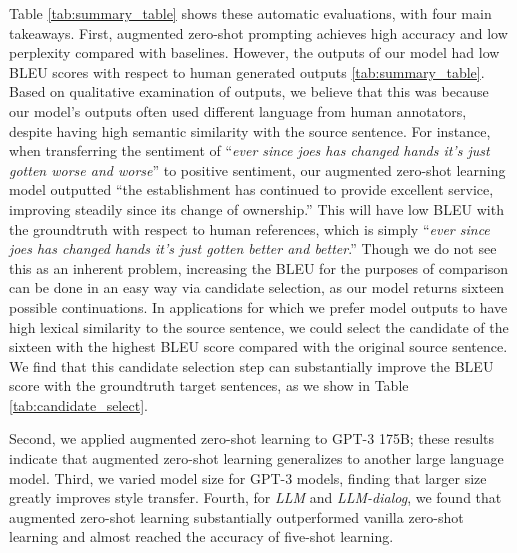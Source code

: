 Table \ref{tab:summary_table} shows these automatic evaluations, with four main takeaways. 
First, augmented zero-shot prompting achieves high accuracy and low perplexity compared with baselines.
However, the outputs of our model had low BLEU scores with respect to human generated outputs \ref{tab:summary_table}. 
Based on qualitative examination of outputs, we believe that this was because our model's outputs often used different language from human annotators,  despite having high semantic similarity with the source sentence.
For instance, when transferring the sentiment of ``\textit{ever since joes has changed hands it's just gotten worse and worse}'' to positive sentiment, our augmented zero-shot learning model outputted ``{the establishment has continued to provide excellent service, improving steadily since its change of ownership}.'' 
This will have low BLEU with the groundtruth with respect to human references, which is simply ``\textit{ever since joes has changed hands it's just gotten better and better}.'' 
Though we do not see this as an inherent problem, increasing the BLEU for the purposes of comparison can be done in an easy way via candidate selection, as our model returns sixteen possible continuations. In applications for which we prefer model outputs to have high lexical similarity to the source sentence, we could select the candidate of the sixteen with the highest BLEU score compared with the original source sentence. 
We find that this candidate selection step can substantially improve the BLEU score with the groundtruth target sentences, as we show in Table \ref{tab:candidate_select}. 



Second, we applied augmented zero-shot learning to GPT-3 175B; these results indicate that augmented zero-shot learning generalizes to another large language model.
Third, we varied model size for GPT-3 models, finding that larger size greatly improves style transfer. 
Fourth, for \textit{LLM} and \textit{LLM-dialog}, we found that augmented zero-shot learning substantially outperformed vanilla zero-shot learning and almost reached the accuracy of five-shot learning. 


